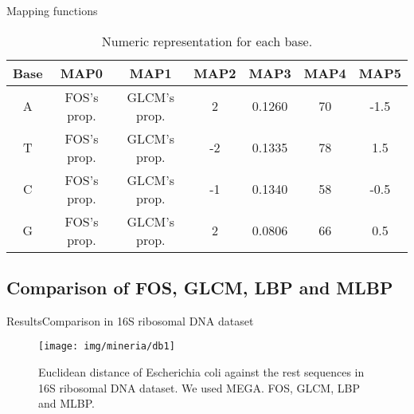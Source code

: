 \documentclass[10pt]{beamer}
\newcommand{\1}{
	\setbeamertemplate{background}{
		\texttt{[image: img/1\_dna]}
		\tikz[overlay] \fill[fill opacity=0.75,fill=white] (0,0) rectangle (-\paperwidth,\paperheight);
	}
}
\begin{document}
\begin{frame}{Mapping functions}
	
	\begin{table}[h]
		\centering
		\caption{Numeric representation for each base.}
		\label{tab:mapping function}
		\setlength{\tabcolsep}{0.5em} %
		{\renewcommand{\arraystretch}{1}%
			\begin{tabular}{ccccccc}
				\hline
				Base           	&  MAP0 & MAP1 	& MAP2  & MAP3 & MAP4 & MAP5 \\ \hline
				A      			& FOS's prop. & GLCM's prop.	& 2 & 0.1260 & 70 & -1.5 \\ 
				T          	   	& FOS's prop.	& GLCM's prop.	& -2 & 0.1335 & 78 & 1.5 \\ 
				C      			& FOS's prop.	& GLCM's prop.	& -1 & 0.1340 & 58 & -0.5 \\ 
				G				& FOS's prop.	& GLCM's prop.	& 2 & 0.0806 & 66 & 0.5 \\ \hline
			\end{tabular}
		}
	\end{table}
\end{frame}


\subsection{Comparison of FOS, GLCM, LBP and MLBP}

\begin{frame}{Results}{Comparison in 16S ribosomal DNA dataset}
\begin{figure}[]
	\centering
	\texttt{[image: img/mineria/db1]}
	\caption{Euclidean distance of Escherichia coli against the rest sequences in 16S ribosomal DNA dataset. We used MEGA. FOS, GLCM, LBP and MLBP.}
	\label{img:comp1}
\end{figure}
\end{frame}
\end{document}
